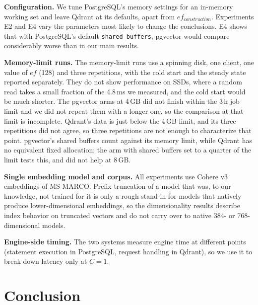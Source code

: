 \documentclass[sigconf, nonacm]{acmart}
\begin{document}
\textbf{Configuration.} We tune PostgreSQL's memory settings for an in-memory working
set and leave Qdrant at its defaults, apart from $ef_{construction}$. Experiments E2 and
E4 vary the parameters most likely to change the conclusions. E4 shows that with
PostgreSQL's default \texttt{shared\_buffers}, pgvector would compare considerably worse
than in our main results.

\textbf{Memory-limit runs.} The memory-limit runs use a spinning disk, one client, one
value of $ef$ (128) and three repetitions, with the cold start and the steady state
reported separately. They do not show performance on SSDs, where a random read takes a
small fraction of the 4.8\,ms we measured, and the cold start would be much shorter. The
pgvector arms at 4\,GB did not finish within the 3\,h job limit and we did not repeat
them with a longer one, so the comparison at that limit is incomplete. Qdrant's data is
just below the 4\,GB limit, and its three repetitions did not agree, so three
repetitions are not enough to characterize that point. pgvector's shared buffers count
against its memory limit, while Qdrant has no equivalent fixed allocation; the arm with
shared buffers set to a quarter of the limit tests this, and did not help at 8\,GB.

\textbf{Single embedding model and corpus.} All experiments use Cohere v3 embeddings of
MS MARCO. Prefix truncation of a model that was, to our knowledge, not trained for it is
only a rough stand-in for models that natively produce lower-dimensional embeddings, so
the dimensionality results describe index behavior on truncated vectors and do not carry
over to native 384- or 768-dimensional models.

\textbf{Engine-side timing.} The two systems measure engine time at different points
(statement execution in PostgreSQL, request handling in Qdrant), so we use it to break
down latency only at $C=1$.

\section{Conclusion}
\end{document}
